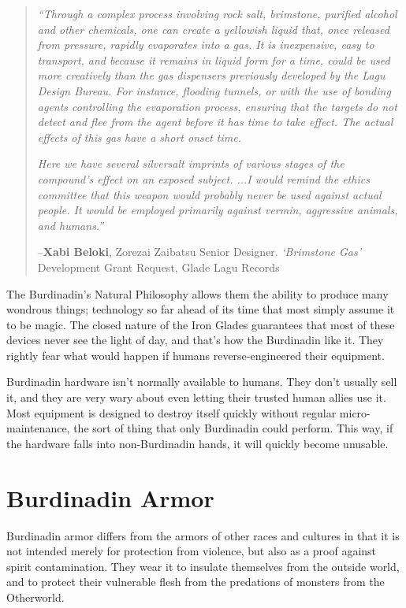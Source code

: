 \documentclass[oneside,11pt,english]{book}
\begin{document}
\begin{quote}
  \emph{“Through a complex process involving rock salt, brimstone, purified
    alcohol and other chemicals, one can create a yellowish liquid that, once
    released from pressure, rapidly evaporates into a gas. It is inexpensive,
    easy to transport, and because it remains in liquid form for a time, could
    be used more creatively than the gas dispensers previously developed by the
    Lagu Design Bureau. For instance, flooding tunnels, or with the use of
    bonding agents controlling the evaporation process, ensuring that the
    targets do not detect and flee from the agent before it has time to take
    effect. The actual effects of this gas have a short onset time.} 

  \emph{Here we have several silversalt imprints of various stages of the
    compound’s effect on an exposed subject. ...I would remind the ethics
    committee that this weapon would probably never be used against actual
    people. It would be employed primarily against vermin, aggressive animals,
    and humans.”}
  
  --\textbf{Xabi Beloki}, Zorezai Zaibatsu Senior Designer. \textit{‘Brimstone Gas’} Development Grant Request, Glade Lagu Records 
\end{quote}

The Burdinadin’s Natural Philosophy allows them the ability to produce many
wondrous things; technology so far ahead of its time that most simply assume it
to be magic. The closed nature of the Iron Glades guarantees that most of these
devices never see the light of day, and that’s how the Burdinadin like it. They
rightly fear what would happen if humans reverse-engineered their equipment. 

Burdinadin hardware isn’t normally available to humans. They don’t usually sell it, and they are very 
wary about even letting their trusted human allies use it. Most equipment is designed to destroy itself 
quickly without regular micro-maintenance, the sort of thing that only Burdinadin could perform. This 
way, if the hardware falls into non-Burdinadin hands, it will quickly become unusable. 

\section{Burdinadin Armor}
Burdinadin armor differs from the armors of other races and cultures in that it is not intended merely for 
protection from violence, but also as a proof against spirit contamination. They wear it to insulate 
themselves from the outside world, and to protect their vulnerable flesh from the predations of monsters 
from the Otherworld. 
\end{document}
